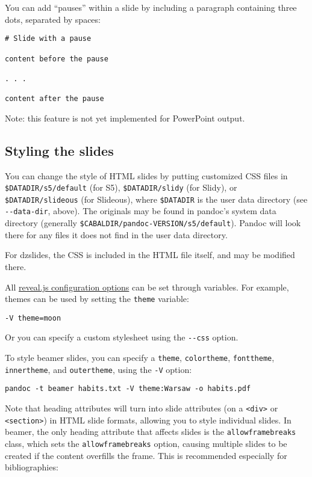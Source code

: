 \documentclass[]{article}
\begin{document}
You can add ``pauses'' within a slide by including a paragraph
containing three dots, separated by spaces:

\begin{verbatim}
# Slide with a pause

content before the pause

. . .

content after the pause
\end{verbatim}

Note: this feature is not yet implemented for PowerPoint output.

\hypertarget{styling-the-slides}{%
\subsection{Styling the slides}\label{styling-the-slides}}

You can change the style of HTML slides by putting customized CSS files
in \texttt{\$DATADIR/s5/default} (for S5), \texttt{\$DATADIR/slidy} (for
Slidy), or \texttt{\$DATADIR/slideous} (for Slideous), where
\texttt{\$DATADIR} is the user data directory (see
\texttt{-\/-data-dir}, above). The originals may be found in pandoc's
system data directory (generally
\texttt{\$CABALDIR/pandoc-VERSION/s5/default}). Pandoc will look there
for any files it does not find in the user data directory.

For dzslides, the CSS is included in the HTML file itself, and may be
modified there.

All \href{https://revealjs.com/config/}{reveal.js configuration options}
can be set through variables. For example, themes can be used by setting
the \texttt{theme} variable:

\begin{verbatim}
-V theme=moon
\end{verbatim}

Or you can specify a custom stylesheet using the \texttt{-\/-css}
option.

To style beamer slides, you can specify a \texttt{theme},
\texttt{colortheme}, \texttt{fonttheme}, \texttt{innertheme}, and
\texttt{outertheme}, using the \texttt{-V} option:

\begin{verbatim}
pandoc -t beamer habits.txt -V theme:Warsaw -o habits.pdf
\end{verbatim}

Note that heading attributes will turn into slide attributes (on a
\texttt{\textless{}div\textgreater{}} or
\texttt{\textless{}section\textgreater{}}) in HTML slide formats,
allowing you to style individual slides. In beamer, the only heading
attribute that affects slides is the \texttt{allowframebreaks} class,
which sets the \texttt{allowframebreaks} option, causing multiple slides
to be created if the content overfills the frame. This is recommended
especially for bibliographies:
\end{document}
